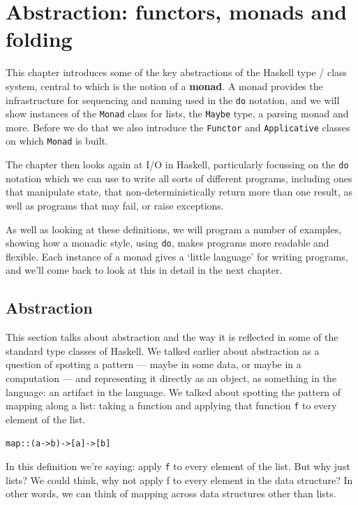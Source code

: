 
\chapter{Abstraction: functors, monads and folding}
\chapstart
\label{actions}

This chapter introduces some of the key abstractions of the Haskell type / class system, central to which is the notion of a \textbf{monad}. A monad provides the infrastructure for sequencing and naming used in the \texttt{do} notation, and we will show instances of the \texttt{Monad} class for lists, the \texttt{Maybe} type, a parsing monad and more. Before we do that we also introduce the \texttt{Functor} and \texttt{Applicative} classes on which \texttt{Monad} is built.

The chapter then looks again at I/O in Haskell, particularly focussing on the \texttt{do} notation which we can use to write all sorts of different programs, including ones that manipulate state, that non-deterministically return more than one result, as well as programs that may fail, or raise exceptions. 

As well as looking at these definitions, we will program a number of examples, showing how a monadic style, using \texttt{do}, makes programs more readable and flexible.
Each instance of a monad gives a `little language' for writing programs, and we'll come back to look at this in detail in the next chapter.

\section{Abstraction}
\label{abstraction}

This section talks about abstraction and the way it is reflected in some of the standard type classes of Haskell. We talked earlier about abstraction as a question of spotting a pattern — maybe in some data, or maybe in a computation — and representing it directly as an object, as something in the language: an artifact in the language. We talked about spotting the pattern of mapping along a list: taking a function and applying that function \texttt{f} to every element of the list. 
\begin{alltt}
map :: (a -> b) -> [a] -> [b]
\end{alltt}
In this definition we're saying: apply \texttt{f} to every element of the list. But why just lists? We could think, why not apply f to every element in the data structure? In other words, we can think of mapping across data structures other than lists.

